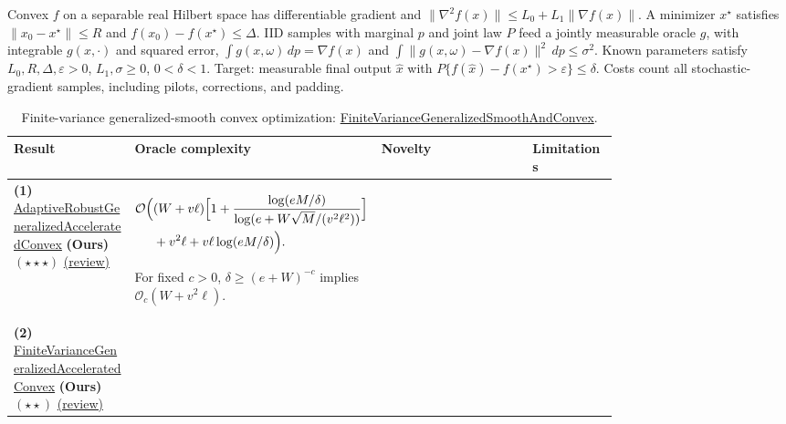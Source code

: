 \begin{table}[tp]
\centering
\caption{Finite-variance generalized-smooth convex optimization: \href{https://github.com/k3nfalt/longtails/blob/main/LongTails/Setups/FiniteVarianceGeneralizedSmoothAndConvex.lean}{FiniteVarianceGeneralizedSmoothAndConvex}.}\label{tab:FiniteVarianceGeneralizedSmoothAndConvex}
\parbox{\linewidth}{\footnotesize Convex $f$ on a separable real Hilbert space has differentiable gradient and $\|\nabla^2 f(x)\|\le L_0+L_1\|\nabla f(x)\|$. A minimizer $x^\star$ satisfies $\|x_0-x^\star\|\le R$ and $f(x_0)-f(x^\star)\le\Delta$. IID samples with marginal $p$ and joint law $P$ feed a jointly measurable oracle $g$, with integrable $g(x,\cdot)$ and squared error, $\int g(x,\omega)\,dp=\nabla f(x)$ and $\int\|g(x,\omega)-\nabla f(x)\|^2\,dp\le\sigma^2$. Known parameters satisfy $L_0,R,\Delta,\varepsilon>0$, $L_1,\sigma\ge0$, $0<\delta<1$. Target: measurable final output $\hat x$ with $P\{f(\hat x)-f(x^\star)>\varepsilon\}\le\delta$. Costs count all stochastic-gradient samples, including pilots, corrections, and padding.}\par\smallskip
\begin{threeparttable}
\footnotesize
\setlength{\tabcolsep}{4pt}\renewcommand{\arraystretch}{1.25}
\begin{tabularx}{\linewidth}{@{}>{\raggedright\arraybackslash}p{0.20\linewidth}>{\raggedright\arraybackslash}p{0.32\linewidth}>{\raggedright\arraybackslash}p{0.25\linewidth}>{\raggedright\arraybackslash}X@{}}
\toprule
\textbf{Result} & \textbf{Oracle complexity} & \textbf{Novelty} & \textbf{Limitations} \\
\midrule
\textbf{(1)} \href{https://github.com/k3nfalt/longtails/blob/main/LongTails/Theorems/AdaptiveRobustGeneralizedAcceleratedConvex.lean}{Adaptive\allowbreak Robust\allowbreak Generalized\allowbreak Accelerated\allowbreak Convex} \textbf{(Ours)} $(\star\star\star)$ \href{https://github.com/k3nfalt/longtails/blob/main/scripts/reviews/AdaptiveRobustGeneralizedAcceleratedConvex.md}{(review)}
& $\begin{aligned}[t]
\mathcal{O}\Bigl(& (W+v\ell)\Bigl[1+\frac{\log(eM/\delta)}{\log(e+W\sqrt M/(v^2\ell^2))}\Bigr]\\
&+v^2\ell+v\ell\log(eM/\delta)\Bigr).
\end{aligned}$
\par For fixed $c>0$, $\delta\ge(e+W)^{-c}$ implies $\mathcal{O}_c(W+v^2\ell)$.
& & \\
\midrule
\textbf{(2)} \href{https://github.com/k3nfalt/longtails/blob/main/LongTails/Theorems/FiniteVarianceGeneralizedAcceleratedConvex.lean}{Finite\allowbreak Variance\allowbreak Generalized\allowbreak Accelerated\allowbreak Convex} \textbf{(Ours)} $(\star\star)$ \href{https://github.com/k3nfalt/longtails/blob/main/scripts/reviews/FiniteVarianceGeneralizedAcceleratedConvex.md}{(review)}

\end{tabularx}
\end{threeparttable}
\end{table}
